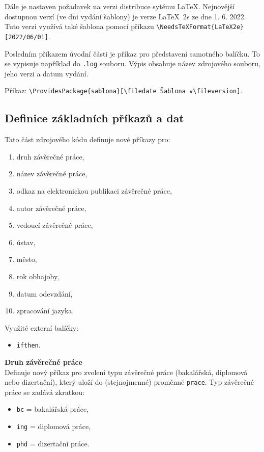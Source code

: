 Dále je nastaven požadavek na verzi distribuce sytému \LaTeX. Nejnovější dostupnou verzí (ve dni vydání šablony) je verze \LaTeX\ $2\epsilon$ ze dne 1. 6. 2022. Tuto verzi využívá také šablona pomocí příkazu \verb|\NeedsTeXFormat{LaTeX2e}[2022/06/01]|.

Posledním příkazem úvodní části je příkaz pro představení samotného balíčku. To se vypisuje například do \verb|.log| souboru. Výpis obsahuje název zdrojového souboru, jeho verzi a datum vydání.

Příkaz: \verb|\ProvidesPackage{sablona}[\filedate Šablona v\fileversion]|.



\newpage
\subsection{Definice základních příkazů a dat}
\label{subsec:definice_prikazy}
Tato část zdrojového kódu definuje nové příkazy pro:

\begin{enumerate}
	\item druh závěrečné práce,
	\item název závěrečné práce,
	\item odkaz na elektronickou publikaci závěrečné práce,
	\item autor závěrečné práce,
	\item vedoucí závěrečné práce,
	\item ústav,
	\item město,
	\item rok obhajoby,
	\item datum odevzdání,
	\item zpracování jazyka.
\end{enumerate}

Využité externí balíčky:

\begin{itemize}[label={-}]
	\item \verb|ifthen|.
\end{itemize}



\textbf{Druh závěrečné práce}\\
Definuje nový příkaz pro zvolení typu závěrečné práce (bakalářská, diplomová nebo dizertační), který uloží do (stejnojmenné) proměnné \verb|prace|. Typ závěrečné práce se zadává zkratkou: 

\begin{itemize}[label={-}]
	\item \verb|bc| = bakalářská práce,
	\item \verb|ing| = diplomová práce,
	\item \verb|phd| = dizertační práce.
\end{itemize}

